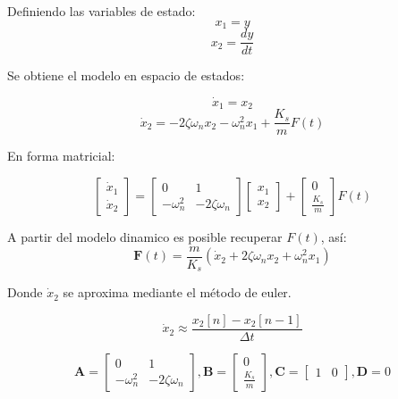 \documentclass[conference]{IEEEtran}
\begin{document}
Definiendo las variables de estado:
\[
	x_1 = y
\]
\[
	x_2 = \frac{dy}{dt}
\]

Se obtiene el modelo en espacio de estados:

\[
	\dot{x}_1 = x_2
\]
\[
	\dot{x}_2 = -2\zeta\omega_n x_2 - \omega_n^2x_1 + \frac{K_s}{m}F(t)
\]


En forma matricial:

\begin{equation*}
	\begin{bmatrix}
		\dot{x}_1 \\
		\dot{x}_2
	\end{bmatrix}
	=
	\begin{bmatrix}
		0 & 1 \\
		-\omega_n^2 & -2\zeta\omega_n
	\end{bmatrix}
	\begin{bmatrix}
		x_1 \\
		x_2
	\end{bmatrix}
	+
	\begin{bmatrix}
		0 \\
		\frac{K_s}{m}
	\end{bmatrix}
	F(t)
\end{equation*}


A partir del modelo dinamico es posible recuperar $F(t)$, as\'i:
\begin{equation*}
	\textbf{F}(t) = \frac{m}{K_s} \left( \dot{x}_2 + 2\zeta\omega_n x_2 + \omega_n^2 x_1 \right)
\end{equation*}


Donde $\dot{x}_2$ se aproxima mediante el m\'etodo de euler.

\begin{equation*}
	\dot{x}_2 \approx \frac{x_2[n] - x_2[n-1]}{\Delta t}
\end{equation*}

\begin{equation*}
	\textbf{A} = 
	\begin{bmatrix}
		0 & 1 \\
		-\omega_n^2 & -2\zeta\omega_n
	\end{bmatrix}
	, \textbf{B} =
	\begin{bmatrix}
		0 \\
		\frac{K_s}{m}
	\end{bmatrix}
	, \textbf{C} =	
	\begin{bmatrix}
		1 & 0
	\end{bmatrix}
	, \textbf{D} = 0
\end{equation*}
\end{document}

